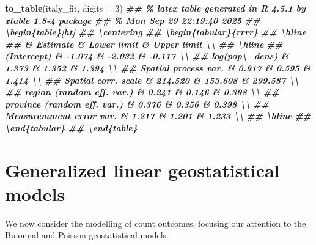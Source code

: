 \documentclass[
  letterpaper,
]{krantz}
\newenvironment{Shaded}{\begin{snugshade}}{\end{snugshade}}
\newcommand{\AttributeTok}[1]{\textcolor[rgb]{0.13,0.29,0.53}{#1}}
\newcommand{\DecValTok}[1]{\textcolor[rgb]{0.00,0.00,0.81}{#1}}
\newcommand{\DocumentationTok}[1]{\textcolor[rgb]{0.56,0.35,0.01}{\textbf{\textit{#1}}}}
\newcommand{\FunctionTok}[1]{\textcolor[rgb]{0.13,0.29,0.53}{\textbf{#1}}}
\newcommand{\NormalTok}[1]{#1}
\begin{document}
\begin{Shaded}
\begin{Highlighting}[]
\FunctionTok{to\_table}\NormalTok{(italy\_fit, }\AttributeTok{digits =} \DecValTok{3}\NormalTok{)}
\DocumentationTok{\#\# \% latex table generated in R 4.5.1 by xtable 1.8{-}4 package}
\DocumentationTok{\#\# \% Mon Sep 29 22:19:40 2025}
\DocumentationTok{\#\# \textbackslash{}begin\{table\}[ht]}
\DocumentationTok{\#\# \textbackslash{}centering}
\DocumentationTok{\#\# \textbackslash{}begin\{tabular\}\{rrrr\}}
\DocumentationTok{\#\#   \textbackslash{}hline}
\DocumentationTok{\#\#  \& Estimate \& Lower limit \& Upper limit \textbackslash{}\textbackslash{} }
\DocumentationTok{\#\#   \textbackslash{}hline}
\DocumentationTok{\#\# (Intercept) \& {-}1.074 \& {-}2.032 \& {-}0.117 \textbackslash{}\textbackslash{} }
\DocumentationTok{\#\#   log(pop\textbackslash{}\_dens) \& 1.373 \& 1.352 \& 1.394 \textbackslash{}\textbackslash{} }
\DocumentationTok{\#\#   Spatial process var. \& 0.917 \& 0.595 \& 1.414 \textbackslash{}\textbackslash{} }
\DocumentationTok{\#\#   Spatial corr. scale \& 214.520 \& 153.608 \& 299.587 \textbackslash{}\textbackslash{} }
\DocumentationTok{\#\#   region (random eff. var.) \& 0.241 \& 0.146 \& 0.398 \textbackslash{}\textbackslash{} }
\DocumentationTok{\#\#   province (random eff. var.) \& 0.376 \& 0.356 \& 0.398 \textbackslash{}\textbackslash{} }
\DocumentationTok{\#\#   Measuremment error var. \& 1.217 \& 1.201 \& 1.233 \textbackslash{}\textbackslash{} }
\DocumentationTok{\#\#    \textbackslash{}hline}
\DocumentationTok{\#\# \textbackslash{}end\{tabular\}}
\DocumentationTok{\#\# \textbackslash{}end\{table\}}
\end{Highlighting}
\end{Shaded}

\section{Generalized linear geostatistical
models}\label{generalized-linear-geostatistical-models}

We now consider the modelling of count outcomes, focusing our attention
to the Binomial and Poisson geostatistical models.
\end{document}
